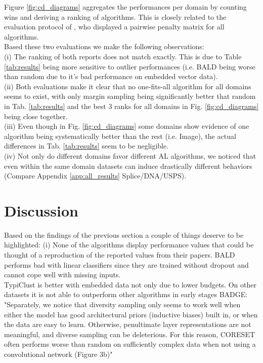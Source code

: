 \documentclass[]{article}
\begin{document}
Figure \ref{fig:cd_diagrams} aggregates the performances per domain by counting wins and deriving a ranking of algorithms.
This is closely related to the evaluation protocol of \cite{ashdeep}, who displayed a pairwise penalty matrix for all algorithms. \\
Based these two evaluations we make the following observations:\\
(i) The ranking of both reports does not match exactly.
This is due to Table \ref{tab:results} being more sensitive to outlier performances (i.e. BALD being worse than random due to it's bad performance on embedded vector data). \\
(ii) Both evaluations make it clear that no one-fits-all algorithm for all domains seems to exist, with only margin sampling being significantly better that random in Tab. \ref{tab:results} and the best 3 ranks for all domains in Fig. \ref{fig:cd_diagrams} being close together. \\
(iii) Even though in Fig. \ref{fig:cd_diagrams} some domains show evidence of one algorithm being systematically better than the rest (i.e. Image), the actual differences in Tab. \ref{tab:results} seem to be negligible. \\
(iv) Not only do different domains favor different AL algorithms, we noticed that even within the same domain datasets can induce drastically different behaviors (Compare Appendix \ref{app:all_results} Splice/DNA/USPS). 

\section{Discussion}
Based on the findings of the previous section a couple of things deserve to be highlighted:
(i) None of the algorithms display performance values that could be thought of a reproduction of the reported values from their papers.
BALD performs bad with linear classifiers since they are trained without dropout and cannot cope well with missing inputs. \\
TypiClust is better with embedded data not only due to lower budgets. On other datasets it is not able to outperform other algorithms in early stages
BADGE: "Separately, we notice that diversity sampling only seems to work well when either the model has good architectural priors (inductive biases) built in, or when the data are easy to learn. Otherwise, penultimate layer representations are not meaningful, and diverse sampling can be deleterious. For this reason, CORESET often performs worse than random on sufficiently complex data when not using a convolutional network (Figure 3b)" \\
\end{document}
